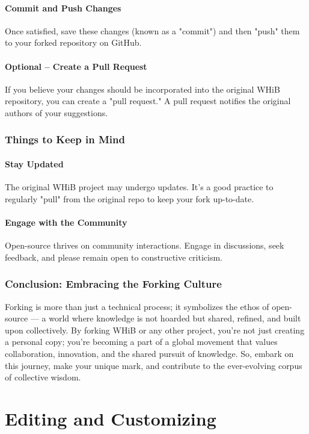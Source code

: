 \documentclass{book}
\begin{document}
\subsubsection*{Commit and Push Changes}
Once satisfied, save these changes (known as a "commit") and then "push" them to your forked repository on GitHub.

\subsubsection*{Optional – Create a Pull Request}
If you believe your changes should be incorporated into the original WHiB repository, you can create a "pull request." A pull request notifies the original authors of your suggestions.

\subsection*{Things to Keep in Mind}
\subsubsection*{Stay Updated}
The original WHiB project may undergo updates. It's a good practice to regularly "pull" from the original repo to keep your fork up-to-date.

\subsubsection*{Engage with the Community}
Open-source thrives on community interactions. Engage in discussions, seek feedback, and please remain open to constructive criticism.

\subsection*{Conclusion: Embracing the Forking Culture}
Forking is more than just a technical process; it symbolizes the ethos of open-source — a world where knowledge is not hoarded but shared, refined, and built upon collectively. By forking WHiB or any other project, you're not just creating a personal copy; you're becoming a part of a global movement that values collaboration, innovation, and the shared pursuit of knowledge. So, embark on this journey, make your unique mark, and contribute to the ever-evolving corpus of collective wisdom.

\chapter{Editing and Customizing}
\end{document}

